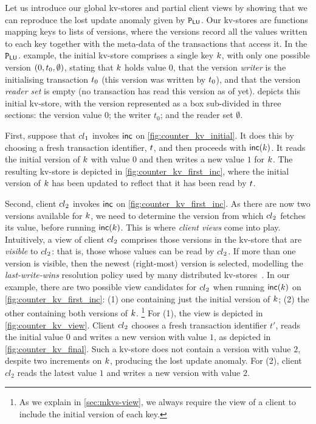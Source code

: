Let us introduce  our global kv-stores and partial client views by
showing that we can reproduce the lost update anomaly given by 
$\mathtt{P}_{\mathsf{LU}}$. 
Our kv-stores are functions mapping keys to lists of versions, where
the versions  record all the values written to each key together with the
meta-data of the transactions that access it. 
In the $\mathtt{P}_{\mathsf{LU}}$.  example, the initial kv-store comprises a single key $k$, with only one possible 
version $(0, t_{0}, \emptyset)$,  stating that $k$ holds value $0$, 
that the version \emph{writer} is the initialising transaction
$t_0$ (this version was written by $t_0$), 
and that the version \emph{reader set} is empty (no transaction has read this version as of yet). 
 depicts this initial kv-store, with the version
represented as a box sub-divided in three sections: the version value $0$;
the writer $t_0$; and the reader set $\emptyset$. 







First, suppose that ${cl}_1$  invokes $\mathsf{inc}$ on
\cref{fig:counter_kv_initial}. It does this by choosing a fresh
transaction identifier, $t$, 
and then proceeds with $\mathsf{inc}(k)$. It reads the initial version
of $k$ with value $0$ 
and then writes a new value $1$ for $k$. 
The resulting kv-store is depicted in \cref{fig:counter_kv_first_inc},
where  the initial version of $k$  has been  updated to reflect that it
has been read by $t$. 

Second, client ${cl}_2$ invokes $\mathsf{inc}$ on
\cref{fig:counter_kv_first_inc}.  As there are now two versions
available for $k$, we need to determine the version from which
${cl}_2$ fetches its value, before running $\mathsf{inc}(k)$.  This is
where \emph{client views} come into play.  Intuitively, a view of
client ${cl}_2$ comprises those versions in the kv-store that are
\emph{visible} to ${cl}_2$: that is, those whose values can be read by
${cl}_2$.  If more than one version is visible, then the newest
(right-most) version is selected, modelling the \emph{last-write-wins}
resolution policy used by many distributed
kv-stores~\cite{vogels:2009:ec:1435417.1435432}.  In our example,
there are two possible view candidates for ${cl}_2$ when running
$\mathsf{inc}(k)$ on \cref{fig:counter_kv_first_inc}: (1) one containing
just the initial version of $k$; (2) the other containing both
versions of $k$.%
\footnote{ As we explain in \cref{sec:mkvs-view}, we always require
  the view of a client to include the initial version of each key.}  
For (1), the view is depicted in
\cref{fig:counter_kv_view}.  Client ${cl}_2$ chooses a fresh
transaction identifier $t'$, reads the initial value $0$ and writes a
new version with value $1$, as depicted in
\cref{fig:counter_kv_final}.  Such a kv-store does not contain a
version with value $2$, despite two increments on $k$, producing
the lost update anomaly.  For (2), client $cl_2$ reads the latest
value $1$ and writes a new version with value $2$.

